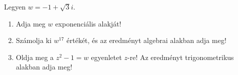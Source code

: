 \documentclass[11pt]{scrartcl}
\begin{document}
Legyen $w = -1 + \sqrt{3} i$.
\begin{enumerate}
	\item Adja meg $w$ exponenciális alakját!

	\item Számolja ki $w^{17}$ értékét, és az eredményt algebrai alakban adja
	      meg!

	\item Oldja meg a $z^2 - 1 = w$ egyenletet $z$-re! Az eredményt
	      trigonometrikus alakban adja meg!
\end{enumerate}
\end{document}
